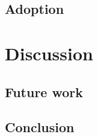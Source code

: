 \documentclass[11pt,a4paper]{article}
\begin{document}
\subsection{Adoption}\label{sec:adoption}
\section{Discussion}
\subsection{Future work}
\subsection{Conclusion}

\pagebreak
\printbibliography{}
\end{document}
